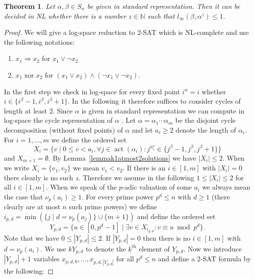\documentclass{article}
\newtheorem{theorem}{Theorem}
\DeclareMathOperator{\act}{act}
\DeclareMathOperator{\xor}{xor}
\begin{document}
\begin{theorem}
Let $\alpha,\beta \in S_n$ be given in standard representation. Then it can be decided in {\sf NL} whether there is a number $z \in \mathbb{N}$ such that $l_\infty(\beta, \alpha^z) \leq 1$.
\end{theorem}
\begin{proof}
We will give a log-space reduction to \textsc{2-SAT} which is {\sf NL}-complete \cite{papadimitriou} and use the following notations:
\begin{enumerate}
\item $x_1 \Rightarrow x_2$ for $x_1 \lor \neg x_2$
\item $x_1 \xor x_2$ for $(x_1 \lor x_2) \land (\neg x_1 \lor \neg x_2)$.
\end{enumerate}
In the first step we check in log-space for every fixed point $i^\alpha = i$ whether $i \in \{i^\beta-1,i^\beta,i^\beta+1\}$. In the following it therefore suffices to consider cycles of length at least $2.$ Since $\alpha$ is given in standard representation we can compute in log-space the cycle representation of $\alpha$ \cite{cook}. Let $\alpha = \alpha_1 \cdots \alpha_m$ be the disjoint cycle decomposition (without fixed points) of $\alpha$ and let $a_i \geq 2$ denote the length of $\alpha_i$. For $i=1,\dots,m$ we define the ordered set
\begin{displaymath}
X_i = \{v \mid 0 \leq v < a_i, \forall j \in \act(\alpha_i): j^{\alpha_i^v} \in \{j^\beta-1,j^\beta,j^\beta+1\}\}
\end{displaymath}
and $X_{m+1} = \emptyset$. By Lemma~\ref{lemmak1atmost2solutions} we have $|X_i| \leq 2$. When we write $X_i = \{v_1,v_2\}$ we mean $v_1 < v_2$. If there is an $i \in [1,m]$ with $|X_i| = 0$ there clearly is no such $z$. Therefore we assume in the following $1 \leq |X_i| \leq 2$ for all $i \in [1,m]$. When we speak of the $p$-adic valuation of some $a_i$ we always mean the case that $\nu_p(a_i) \geq 1$. For every prime power $p^d \leq n$ with $d \geq 1$ (there clearly are at most $n$ such prime powers) we define $i_{p,d} = \min(\{j \mid d = \nu_p(a_j)\} \cup \{m+1\})$ and define the ordered set
\begin{displaymath}
Y_{p,d} = \{u \in [0,p^d-1] \mid \exists v \in X_{i_{p,d}}: v \equiv u \bmod p^d\}.
\end{displaymath}
Note that we have $0 \leq |Y_{p,d}| \leq 2$. If $|Y_{p,d}| = 0$ then there is no $i \in [1,m]$ with $d = \nu_p(a_i)$. We use $kY_{p,d}$ to denote the $k^\text{th}$ element of $Y_{p,d}$. Now we introduce $|Y_{p,d}|+1$ variables $x_{p,d,0},\dots,x_{p,d,|Y_{p,d}|}$ for all $p^d \leq n$ and define a \textsc{2-SAT} formula by the following:

\end{proof}
\end{document}
